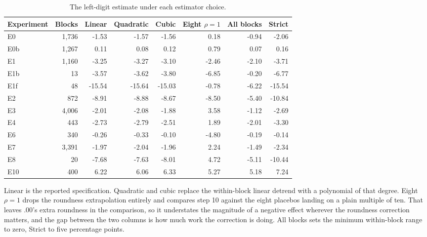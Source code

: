 \begin{table}[t]
\centering
\caption{The left-digit estimate under each estimator choice.}
\label{tab:robust}
\small
\begin{tabular}{lrrrrrrr}
\toprule
Experiment & Blocks & Linear & Quadratic & Cubic & Eight $\rho{=}1$ & All blocks & Strict \\
\midrule
E0 & 1,736 & -1.53 & -1.57 & -1.56 & 0.18 & -0.94 & -2.06 \\
E0b & 1,267 & 0.11 & 0.08 & 0.12 & 0.79 & 0.07 & 0.16 \\
E1 & 1,160 & -3.25 & -3.27 & -3.10 & -2.46 & -2.10 & -3.71 \\
E1b &    13 & -3.57 & -3.62 & -3.80 & -6.85 & -0.20 & -6.77 \\
E1f &    48 & -15.54 & -15.64 & -15.03 & -0.78 & -6.22 & -15.54 \\
E2 &   872 & -8.91 & -8.88 & -8.67 & -8.50 & -5.40 & -10.84 \\
E3 & 4,006 & -2.01 & -2.08 & -1.88 & 3.58 & -1.12 & -2.69 \\
E4 &   443 & -2.73 & -2.79 & -2.51 & 1.89 & -2.01 & -3.30 \\
E6 &   340 & -0.26 & -0.33 & -0.10 & -4.80 & -0.19 & -0.14 \\
E7 & 3,391 & -1.97 & -2.04 & -1.96 & 2.24 & -1.49 & -2.34 \\
E8 &    20 & -7.68 & -7.63 & -8.01 & 4.72 & -5.11 & -10.44 \\
E10 &   400 & 6.22 & 6.06 & 6.33 & 5.27 & 5.18 & 7.24 \\
\bottomrule
\end{tabular}
\vspace{2pt}
\parbox{\linewidth}{\footnotesize Linear is the reported specification. Quadratic and cubic replace the within-block linear detrend with a polynomial of that degree. Eight $\rho{=}1$ drops the roundness extrapolation entirely and compares step 10 against the eight placebos landing on a plain multiple of ten. That leaves $.00$'s extra roundness in the comparison, so it understates the magnitude of a negative effect wherever the roundness correction matters, and the gap between the two columns is how much work the correction is doing. All blocks sets the minimum within-block range to zero, Strict to five percentage points.}
\end{table}
